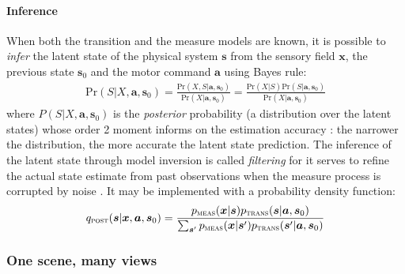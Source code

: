 \documentclass[12pt,twoside,openright]{article}
\begin{document}

\paragraph{Inference}

When both the transition and the measure models are known, it is possible to \emph{infer} the latent state of the physical system $\boldsymbol{s}$ from the sensory field $\boldsymbol{x}$, the previous state $\boldsymbol{s}_0$ and the motor command $\boldsymbol{a}$ using Bayes rule:
\begin{align}
\text{Pr}(S|X,\boldsymbol{a},\boldsymbol{s}_0) = \frac{\text{Pr}(X,S|\boldsymbol{a},\boldsymbol{s}_0)}{\text{Pr}(X|\boldsymbol{a},\boldsymbol{s}_0)} %
= \frac{\text{Pr}(X|S) \text{Pr}(S|\boldsymbol{a},\boldsymbol{s}_0)}
{\text{Pr}(X|\boldsymbol{a},\boldsymbol{s}_0)}\label{eq:post-Pr}
\end{align}
where $P(S|X,\boldsymbol{a},\boldsymbol{s}_0)$ is the \emph{posterior} probability (a distribution over the latent states) whose order 2 moment informs on the estimation accuracy : the narrower the distribution, the more accurate the latent state prediction. 
The inference of the latent state through model inversion is called \emph{filtering} for it serves to refine the actual state estimate from past observations when the measure process is corrupted by noise \cite{Kalman1960}.
It may be implemented with a probability density function:
\begin{align}
q_\text{\sc post}(\boldsymbol{s}|\boldsymbol{x},\boldsymbol{a}, \boldsymbol{s}_0) 
= \frac{p_\text{\sc meas}(\boldsymbol{x}|\boldsymbol{s}) p_\text{\sc trans}(\boldsymbol{s}|\boldsymbol{a},\boldsymbol{s}_0)}
{\sum_{\boldsymbol{s}'}p_\text{\sc meas}(\boldsymbol{x}|\boldsymbol{s}') p_\text{\sc trans}(\boldsymbol{s}'|\boldsymbol{a},\boldsymbol{s}_0)}\label{eq:post-pdf}
\end{align}


\subsubsection{One scene, many views}
\end{document}
